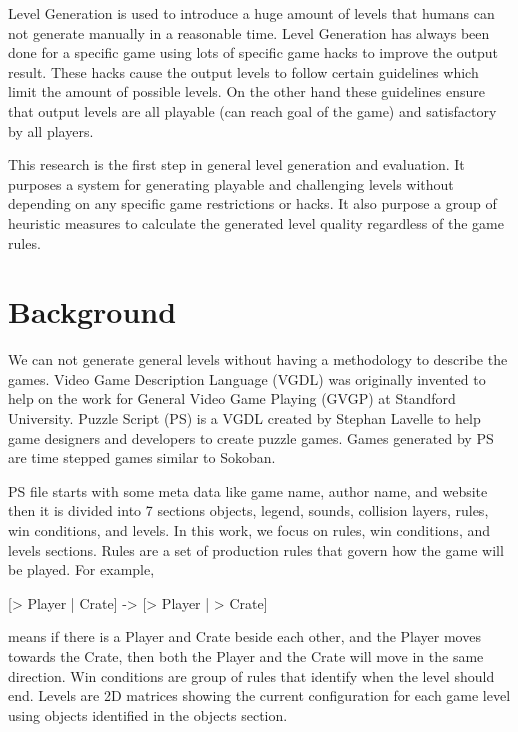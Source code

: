 \documentclass[letterpaper]{article}
\begin{document}
Level Generation is used to introduce a huge amount of levels that humans can not generate manually in a reasonable time. Level Generation has always been done for a specific game using lots of specific game hacks to improve the output result. These hacks cause the output levels to follow certain guidelines which limit the amount of possible levels. On the other hand these guidelines ensure that output levels are all playable (can reach goal of the game) and satisfactory by all players\cite{mcGenerateEverything}.\\\par

This research is the first step in general level generation and evaluation. It purposes a system for generating playable and challenging levels without depending on any specific game restrictions or hacks. It also purpose a group of heuristic measures to calculate the generated level quality regardless of the game rules.

\section{Background}
We can not generate general levels without having a methodology to describe the games. Video Game Description Language (VGDL) was originally invented to help on the work for General Video Game Playing (GVGP)\cite{gvgp} at Standford University. Puzzle Script (PS) is a VGDL created by Stephan Lavelle to help game designers and developers to create puzzle games\cite{puzzleScript}. Games generated by PS are time stepped games similar to Sokoban\cite{sokoban}.\\\par

PS file starts with some meta data like game name, author name, and website then it is divided into 7 sections objects, legend, sounds, collision layers, rules, win conditions, and levels. In this work, we focus on rules, win conditions, and levels sections. Rules are a set of production rules that govern how the game will be played. For example, \begin{center}[> Player | Crate] -> [> Player | > Crate]\end{center} means if there is a Player and Crate beside each other, and the Player moves towards the Crate, then both the Player and the Crate will move in the same direction. Win conditions are group of rules that identify when the level should end. Levels are 2D matrices showing the current configuration for each game level using objects identified in the objects section.
\end{document}

